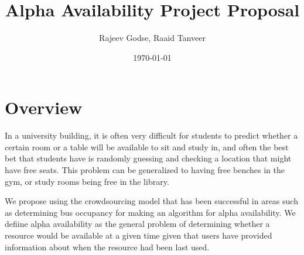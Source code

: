 \documentclass[11pt]{article}
\title{Alpha Availability Project Proposal}
\author{Rajeev Godse, Raaid Tanveer}
\date{\today}
\begin{document}
  \maketitle
  \section*{Overview}
  In a university building, it is often very difficult for students to predict 
  whether a certain room or a table will be available to sit and study in, and
  often the best bet that students have is randomly guessing and checking a 
  location that might have free seats. This problem can be generalized to having 
  free benches in the gym, or study rooms being free in the library. 

  We propose using the crowdsourcing model that has been successful in areas 
  such as determining bus occupancy for making an algorithm for alpha availability. 
  We defiine alpha availability as the general problem of determining whether 
  a resource would be available at a given time given that users have 
  provided information about when the resource had been last used. 
\end{document}
